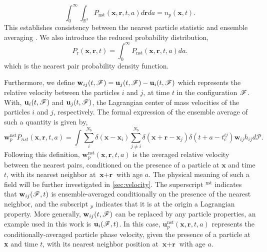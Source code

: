 \begin{equation*}
    \int_0^\infty 
    \int_{\mathbb{R}^3}
     P_\text{nst}(\textbf{x},\textbf{r},t,a) d\textbf{r} da = n_p(\textbf{x},t). 
    \label{eq:Pnst}
\end{equation*}
This establishes consistency between the nearest particle statistic and ensemble averaging \citep{zhang2021ensemble}. 
We also introduce the reduced probability distribution,
\begin{equation*}
    P_\text{r}(\textbf{x},\textbf{r},t)
    = \int_0^\infty P_\text{nst}(\textbf{x},\textbf{r},t,a) da.
\end{equation*}
which is the nearest pair probability density function.


Furthermore, we define $\textbf{w}_{ij}(t,\mathscr{F}) = \textbf{u}_j(t,\mathscr{F}) - \textbf{u}_i(t,\mathscr{F})$ which represents the relative velocity between the particles $i$ and $j$, at time $t$ in the configuration $\mathscr{F}$. 
With, $\textbf{u}_i(t,\mathscr{F})$ and $\textbf{u}_j(t,\mathscr{F})$, the Lagrangian center of mass velocities of the particles $i$ and $j$, respectively. 
The formal expression of the ensemble average of such a quantity is given by,
\begin{equation*}
    \textbf{w}^\text{nst}_p P_{nst}(\textbf{x},\textbf{r},t,a)
    = 
    \int \sum_{i}^{N_b}\delta(\textbf{x}-\textbf{x}_i)
    \sum_{j\neq i}^{N_b}\delta(\textbf{x}+\textbf{r}-\textbf{x}_j) 
    \delta(t+a-t_c^{ij}) 
    \textbf{w}_{ij}
    h_{ij} 
    d\mathscr{P}.
    \label{eq:q_nstij}
\end{equation*}
Following this definition, $\textbf{w}^\text{nst}_p(\textbf{x},\textbf{r},t,a)$ is the averaged relative velocity between the nearest pairs, conditioned on the presence of a particle at $\textbf{x}$ and time $t$, with its nearest neighbor at $\textbf{x}+\textbf{r}$ with age $a$. 
The physical meaning of such a field will be further investigated in \ref{sec:velocity}. 
The superscript $^\text{nst}$ indicates that $\textbf{w}_{ij}(\mathscr{F},t)$ is ensemble-averaged conditionally on the presence of the nearest neighbor, and the subscript $_p$ indicates that it is at the origin a Lagrangian property. 
More generally, $\textbf{w}_{ij}(t,\mathscr{F})$ can be replaced by any particle properties, an example used in this work is $\textbf{u}_i(\mathscr{F},t)$.
In this case, $\textbf{u}^\text{nst}_p(\textbf{x},\textbf{r},t,a)$ represents the conditionally-averaged particle phase velocity, given the presence of a particle at \textbf{x} and time $t$, with its nearest neighbor position at $\textbf{x}+\textbf{r}$ with age $a$. 

